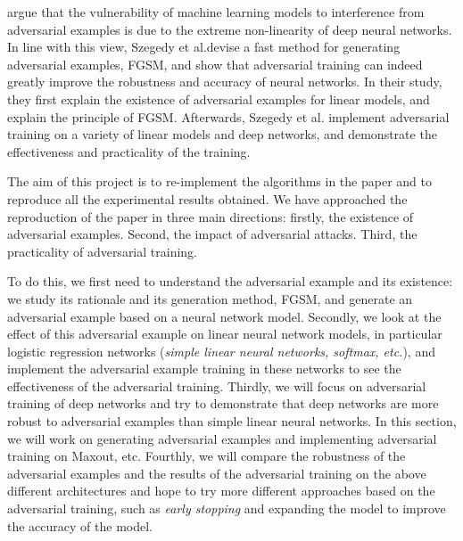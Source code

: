 


\cite{szegedy2013intriguing} argue that the vulnerability of machine learning models to interference from adversarial examples is due to the extreme non-linearity of deep neural networks. In line with this view, Szegedy et al.devise a fast method for generating adversarial examples, FGSM, and show that adversarial training can indeed greatly improve the robustness and accuracy of neural networks. In their study, they first explain the existence of adversarial examples for linear models, and explain the principle of FGSM. Afterwards, Szegedy et al. implement adversarial training on a variety of linear models and deep networks, and demonstrate the effectiveness and practicality of the training. 

The aim of this project is to re-implement the algorithms in the paper and to reproduce all the experimental results obtained. We have approached the reproduction of the paper in three main directions: firstly, the existence of adversarial examples. Second, the impact of adversarial attacks. Third, the practicality of adversarial training.

To do this, we first need to understand the adversarial example and its existence: we study its rationale and its generation method, FGSM, and generate an adversarial example based on a neural network model. Secondly, we look at the effect of this adversarial example on linear neural network models, in particular logistic regression networks (\textit{simple linear neural networks, softmax, etc.}), and implement the adversarial example training in these networks to see the effectiveness of the adversarial training. Thirdly, we will focus on adversarial training of deep networks and try to demonstrate that deep networks are more robust to adversarial examples than simple linear neural networks. In this section, we will work on generating adversarial examples and implementing adversarial training on Maxout, etc. Fourthly, we will compare the robustness of the adversarial examples and the results of the adversarial training on the above different architectures and hope to try more different approaches based on the adversarial training, such as  \textit{early stopping} and expanding the model to improve the accuracy of the model.\\